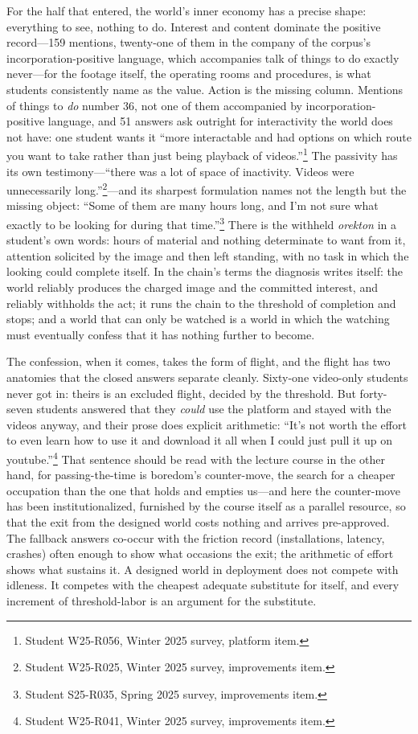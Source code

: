 \documentclass{article}
\begin{document}
For the half that entered, the world's inner economy has a precise shape: everything to see, nothing to do. Interest and content dominate the positive record---159 mentions, twenty-one of them in the company of the corpus's incorporation-positive language, which accompanies talk of things to do exactly never---for the footage itself, the operating rooms and procedures, is what students consistently name as the value. Action is the missing column. Mentions of things to \textit{do} number 36, not one of them accompanied by incorporation-positive language, and 51 answers ask outright for interactivity the world does not have: one student wants it ``more interactable and had options on which route you want to take rather than just being playback of videos.''\footnote{Student W25-R056, Winter 2025 survey, platform item.} The passivity has its own testimony---``there was a lot of space of inactivity. Videos were unnecessarily long.''\footnote{Student W25-R025, Winter 2025 survey, improvements item.}---and its sharpest formulation names not the length but the missing object: ``Some of them are many hours long, and I'm not sure what exactly to be looking for during that time.''\footnote{Student S25-R035, Spring 2025 survey, improvements item.} There is the withheld \textit{orekton} in a student's own words: hours of material and nothing determinate to want from it, attention solicited by the image and then left standing, with no task in which the looking could complete itself. In the chain's terms the diagnosis writes itself: the world reliably produces the charged image and the committed interest, and reliably withholds the act; it runs the chain to the threshold of completion and stops; and a world that can only be watched is a world in which the watching must eventually confess that it has nothing further to become.

The confession, when it comes, takes the form of flight, and the flight has two anatomies that the closed answers separate cleanly. Sixty-one video-only students never got in: theirs is an excluded flight, decided by the threshold. But forty-seven students answered that they \textit{could} use the platform and stayed with the videos anyway, and their prose does explicit arithmetic: ``It's not worth the effort to even learn how to use it and download it all when I could just pull it up on youtube.''\footnote{Student W25-R041, Winter 2025 survey, improvements item.} That sentence should be read with the lecture course in the other hand, for passing-the-time is boredom's counter-move, the search for a cheaper occupation than the one that holds and empties us---and here the counter-move has been institutionalized, furnished by the course itself as a parallel resource, so that the exit from the designed world costs nothing and arrives pre-approved. The fallback answers co-occur with the friction record (installations, latency, crashes) often enough to show what occasions the exit; the arithmetic of effort shows what sustains it. A designed world in deployment does not compete with idleness. It competes with the cheapest adequate substitute for itself, and every increment of threshold-labor is an argument for the substitute.
\end{document}
